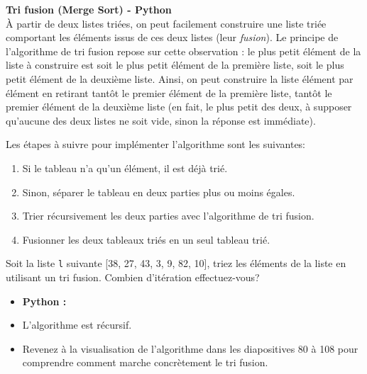 \begin{Exercice} [30 minutes] \textbf{Tri fusion (Merge Sort) - Python} \\
    À partir de deux listes triées, on peut facilement construire une liste triée comportant les éléments issus de ces deux listes (leur \textit{fusion}). Le principe de l'algorithme de tri fusion repose sur cette observation : le plus petit élément de la liste à construire est soit le plus petit élément de la première liste, soit le plus petit élément de la deuxième liste. Ainsi, on peut construire la liste élément par élément en retirant tantôt le premier élément de la première liste, tantôt le premier élément de la deuxième liste (en fait, le plus petit des deux, à supposer qu'aucune des deux listes ne soit vide, sinon la réponse est immédiate). 
    
    Les étapes à suivre pour implémenter l'algorithme sont les suivantes:
    \begin{enumerate}
        \item Si le tableau n'a qu'un élément, il est déjà trié.
        \item Sinon, séparer le tableau en deux parties plus ou moins égales.
        \item Trier récursivement les deux parties avec l'algorithme de tri fusion.
        \item Fusionner les deux tableaux triés en un seul tableau trié.
    \end{enumerate}
    
    Soit la liste \lstinline{l} suivante [38, 27, 43, 3, 9, 82, 10], triez les éléments de la liste en utilisant un tri fusion. Combien d'itération effectuez-vous?
    
    \begin{itemize}
        \item \textbf{Python :}
            
    \end{itemize}
    
    \begin{conseil}
    \begin{itemize}
        \item L'algorithme est récursif. 
        \item Revenez à la visualisation de l'algorithme dans les diapositives 80 à 108 pour comprendre comment marche concrètement le tri fusion. 
    \end{itemize}
    
    \end{conseil}
    

\end{Exercice}
